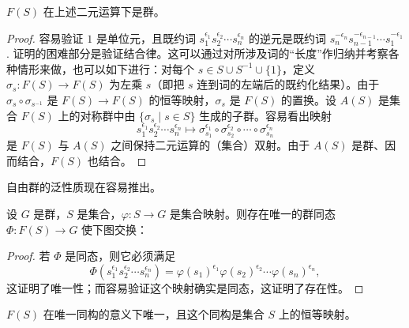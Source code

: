 \begin{theorem}\label{thm:6.16}
\(F(S)\) 在上述二元运算下是群。
\end{theorem}

\begin{proof}
容易验证 \(1\) 是单位元，且既约词 \(s_1^{\epsilon_1}s_2^{\epsilon_2}\cdots s_n^{\epsilon_n}\) 的逆元是既约词 \(s_n^{-\epsilon_n}s_{n-1}^{-\epsilon_{n-1}}\cdots s_1^{-\epsilon_1}\). 证明的困难部分是验证结合律。这可以通过对所涉及词的“长度”作归纳并考察各种情形来做，也可以如下进行：对每个 \(s \in S \cup S^{-1} \cup \{1\}\)，定义 \(\sigma_s : F(S) \to F(S)\) 为左乘 \(s\)（即把 \(s\) 连到词的左端后的既约化结果）。由于 \(\sigma_s \circ \sigma_{s^{-1}}\) 是 \(F(S) \to F(S)\) 的恒等映射，\(\sigma_s\) 是 \(F(S)\) 的置换。设 \(A(S)\) 是集合 \(F(S)\) 上的对称群中由 \(\{\sigma_s \mid s \in S\}\) 生成的子群。容易看出映射
\[
s_1^{\epsilon_1}s_2^{\epsilon_2}\cdots s_n^{\epsilon_n} \mapsto \sigma_{s_1}^{\epsilon_1} \circ \sigma_{s_2}^{\epsilon_2} \circ \cdots \circ \sigma_{s_n}^{\epsilon_n}
\]
是 \(F(S)\) 与 \(A(S)\) 之间保持二元运算的（集合）双射。由于 \(A(S)\) 是群、因而结合，\(F(S)\) 也结合。
\end{proof}

自由群的泛性质现在容易推出。

\begin{theorem}\label{thm:6.17}
设 \(G\) 是群，\(S\) 是集合，\(\varphi : S \to G\) 是集合映射。则存在唯一的群同态 \(\Phi : F(S) \to G\) 使下图交换：
\begin{center}
\end{center}
\end{theorem}

\begin{proof}
若 \(\Phi\) 是同态，则它必须满足
\[
\Phi(s_1^{\epsilon_1}s_2^{\epsilon_2}\cdots s_n^{\epsilon_n}) = \varphi(s_1)^{\epsilon_1}\varphi(s_2)^{\epsilon_2}\cdots\varphi(s_n)^{\epsilon_n},
\]
这证明了唯一性；而容易验证这个映射确实是同态，这证明了存在性。
\end{proof}

\begin{corollary}\label{cor:6.18}
\(F(S)\) 在唯一同构的意义下唯一，且这个同构是集合 \(S\) 上的恒等映射。
\end{corollary}

